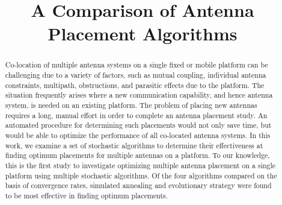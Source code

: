 \documentclass[conference]{IEEEtran}
\begin{document}
%
\title{A Comparison of Antenna Placement Algorithms\vspace{-3ex}}

\author{
}
\maketitle
\begin{abstract}
Co-location of multiple antenna systems on a single fixed or mobile platform can be challenging due to a variety of factors, such as mutual coupling, individual antenna constraints, multipath, obstructions, and parasitic effects due to the platform. The situation frequently arises where a new communication capability, and hence antenna system, is needed on an existing platform. The problem of placing new antennas requires a long, manual effort in order to complete an antenna placement study. An automated procedure for determining such placements would not only save time, but would be able to optimize the performance of all co-located antenna systems. In this work, we examine a set of stochastic algorithms to determine their effectiveness at finding optimum placements for multiple antennas on a platform. To our knowledge, this is the first study to investigate optimizing multiple antenna placement on a single platform using multiple stochastic algorithms. Of the four algorithms compared on the basis of convergence rates, simulated annealing and evolutionary strategy were found to be most effective in finding optimum placements.
\end{abstract}


%
\IEEEpeerreviewmaketitle
\end{document}
